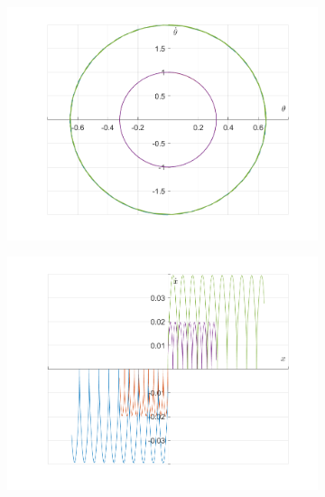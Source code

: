 \documentclass{article}
\begin{document}
	\begin{figure}[h!]
		\centering
		\begin{subfigure}[b]{0.48\linewidth}
			\includegraphics[width=\linewidth]{./SmallOscillations/S5/F5.png}
		\end{subfigure}
		\begin{subfigure}[b]{0.48\linewidth}
			\includegraphics[width=\linewidth]{./SmallOscillations/S5/F6.png}
		\end{subfigure}
	\end{figure}
	\newpage
	
\end{document}

